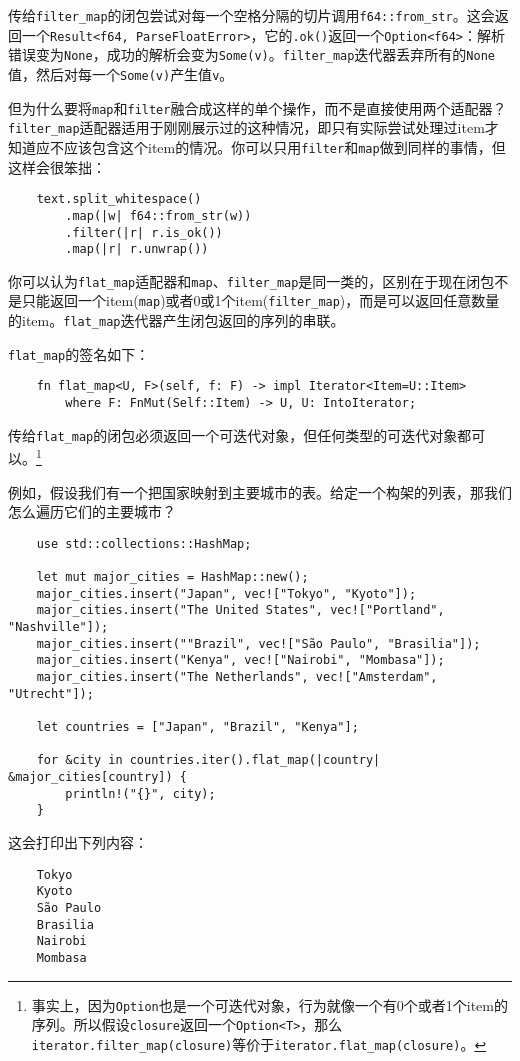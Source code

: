 传给\texttt{filter\_map}的闭包尝试对每一个空格分隔的切片调用\texttt{f64::from\_str}。这会返回一个\texttt{Result<f64, ParseFloatError>}，它的\texttt{.ok()}返回一个\texttt{Option<f64>}：解析错误变为\texttt{None}，成功的解析会变为\texttt{Some(v)}。\texttt{filter\_map}迭代器丢弃所有的\texttt{None}值，然后对每一个\texttt{Some(v)}产生值\texttt{v}。

但为什么要将\texttt{map}和\texttt{filter}融合成这样的单个操作，而不是直接使用两个适配器？\texttt{filter\_map}适配器适用于刚刚展示过的这种情况，即只有实际尝试处理过item才知道应不应该包含这个item的情况。你可以只用\texttt{filter}和\texttt{map}做到同样的事情，但这样会很笨拙：
\begin{verbatim}
    text.split_whitespace()
        .map(|w| f64::from_str(w))
        .filter(|r| r.is_ok())
        .map(|r| r.unwrap())
\end{verbatim}

你可以认为\texttt{flat\_map}适配器和\texttt{map}、\texttt{filter\_map}是同一类的，区别在于现在闭包不是只能返回一个item(\texttt{map})或者0或1个item(\texttt{filter\_map})，而是可以返回任意数量的item。\texttt{flat\_map}迭代器产生闭包返回的序列的串联。

\texttt{flat\_map}的签名如下：
\begin{verbatim}
    fn flat_map<U, F>(self, f: F) -> impl Iterator<Item=U::Item>
        where F: FnMut(Self::Item) -> U, U: IntoIterator;
\end{verbatim}
传给\texttt{flat\_map}的闭包必须返回一个可迭代对象，但任何类型的可迭代对象都可以。\footnote{事实上，因为\texttt{Option}也是一个可迭代对象，行为就像一个有0个或者1个item的序列。所以假设\texttt{closure}返回一个\texttt{Option<T>}，那么\texttt{iterator.filter\_map(closure)}等价于\texttt{iterator.flat\_map(closure)}。}

例如，假设我们有一个把国家映射到主要城市的表。给定一个构架的列表，那我们怎么遍历它们的主要城市？
\begin{verbatim}
    use std::collections::HashMap;

    let mut major_cities = HashMap::new();
    major_cities.insert("Japan", vec!["Tokyo", "Kyoto"]);
    major_cities.insert("The United States", vec!["Portland", "Nashville"]);
    major_cities.insert(""Brazil", vec!["São Paulo", "Brasilia"]);
    major_cities.insert("Kenya", vec!["Nairobi", "Mombasa"]);
    major_cities.insert("The Netherlands", vec!["Amsterdam", "Utrecht"]);

    let countries = ["Japan", "Brazil", "Kenya"];

    for &city in countries.iter().flat_map(|country| &major_cities[country]) {
        println!("{}", city);
    }
\end{verbatim}
这会打印出下列内容：
\begin{verbatim}
    Tokyo
    Kyoto
    São Paulo
    Brasilia
    Nairobi
    Mombasa
\end{verbatim}

